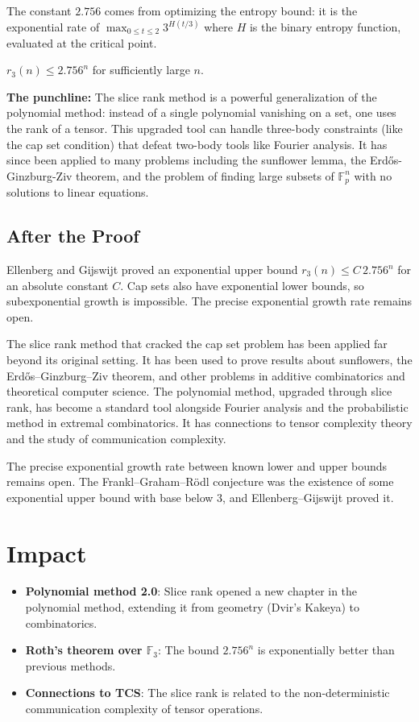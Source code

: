 The constant $2.756$ comes from optimizing the entropy bound: it is the exponential rate of $\max_{0 \le t \le 2} 3^{H(t/3)}$ where $H$ is the binary entropy function, evaluated at the critical point.

\begin{theorem}
$r_3(n) \le 2.756^n$ for sufficiently large $n$.
\end{theorem}

\begin{highlightbox}
\textbf{The punchline:} The slice rank method is a powerful generalization of the polynomial method: instead of a single polynomial vanishing on a set, one uses the rank of a tensor. This upgraded tool can handle three-body constraints (like the cap set condition) that defeat two-body tools like Fourier analysis. It has since been applied to many problems including the sunflower lemma, the Erd\H{o}s-Ginzburg-Ziv theorem, and the problem of finding large subsets of $\mathbb{F}_p^n$ with no solutions to linear equations.
\end{highlightbox}

\subsection{After the Proof}

Ellenberg and Gijswijt proved an exponential upper bound $r_3(n)\le C\,2.756^n$ for an absolute constant $C$. Cap sets also have exponential lower bounds, so subexponential growth is impossible. The precise exponential growth rate remains open.

The slice rank method that cracked the cap set problem has been applied far beyond its original setting. It has been used to prove results about sunflowers, the Erd\H{o}s--Ginzburg--Ziv theorem, and other problems in additive combinatorics and theoretical computer science. The polynomial method, upgraded through slice rank, has become a standard tool alongside Fourier analysis and the probabilistic method in extremal combinatorics. It has connections to tensor complexity theory and the study of communication complexity.

The precise exponential growth rate between known lower and upper bounds remains open. The Frankl--Graham--Rödl conjecture was the existence of some exponential upper bound with base below 3, and Ellenberg--Gijswijt proved it.

\section{Impact}
\begin{itemize}
\item \textbf{Polynomial method 2.0}: Slice rank opened a new chapter in the polynomial method, extending it from geometry (Dvir's Kakeya) to combinatorics.
\item \textbf{Roth's theorem over $\mathbb{F}_3$}: The bound $2.756^n$ is exponentially better than previous methods.
\item \textbf{Connections to TCS}: The slice rank is related to the non-deterministic communication complexity of tensor operations.
\end{itemize}

